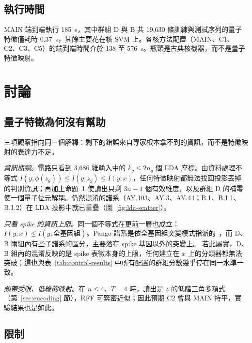 \documentclass[10pt,a4paper]{article}
\begin{document}
\subsection{執行時間}
\label{sec:res-cost}

MAIN 端到端執行 185~s，其中群組 D 與 B 共 19,630 條訓練與測試序列的量子特徵僅耗時 0.37~s，其餘主要花在核 SVM 上。各核方法配置（MAIN、C1、C2、C3、C5）的端到端時間介於 138 至 576~s。瓶頸是古典核機器，而不是量子特徵映射。

\section{討論}
\label{sec:discussion}

\subsection{量子特徵為何沒有幫助}
\label{sec:why}

三項觀察指向同一個解釋：剩下的錯誤來自專家根本拿不到的資訊，而不是特徵映射的表達力不足。

\textit{資訊瓶頸。}電路只看到 3,686 維輸入中的 $k_g\le2n_g$ 個 LDA 座標。由資料處理不等式 $I(y;\phi(z_g))\le I(y;z_g)\le I(y;x)$，任何特徵映射都無法找回投影丟掉的判別資訊；再加上命題~1 使讀出只剩 $3n-1$ 個有效維度，以及群組 D 的補零使一個量子位元解耦。仍然混淆的譜系（AY.103、AY.3、AY.44；B.1、B.1.1、B.1.2）在 LDA 投影中就已重疊（圖~\ref{fig:lda-scatter}）。

\textit{只看 spike 的資訊上限。}同一個不等式在更前一層也成立：$I(y;x)\le I(y;\text{全基因組})$。Pango 譜系是依全基因組突變模式指派的~\cite{rambaut2020pango,otoole2021pangolin}，而 D、B 兩組內有些子譜系的區分，主要落在 spike 基因以外的突變上。
若此屬實，D、B 組內的混淆反映的是 spike 表徵本身的上限，任何建立在 $x$ 上的分類器都無法突破；這也與表~\ref{tab:control-results} 中所有配置的群組分數幾乎停在同一水準一致。

\textit{頻帶受限、低維的映射。}在 $n\le4$、$T=4$ 時，讀出是 $z$ 的低階三角多項式（第~\ref{sec:encoding} 節），RFF 可緊密近似；因此預期 C2 會與 MAIN 持平，實驗結果也是如此。

\subsection{限制}
\label{sec:limitations}
\end{document}
